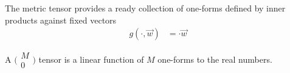 \documentclass[book.tex]{subfiles}
\begin{document}
The metric tensor provides a ready collection of one-forms defined by inner products against fixed vectors
\begin{align}
g(\cdot, \vec{w}) &= \cdot \vec{w}
\end{align}



A $\big(\begin{smallmatrix}M \\ 0 \end{smallmatrix}\big)$ tensor is a linear function of $M$ one-forms to the real numbers.
\end{document}
